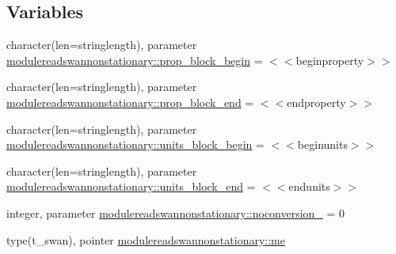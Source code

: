 \subsection*{Variables}
\begin{DoxyCompactItemize}
\item 
character(len=stringlength), parameter \mbox{\hyperlink{namespacemodulereadswannonstationary_a49b70911a8192a84cf1ee4184e95069e}{modulereadswannonstationary\+::prop\+\_\+block\+\_\+begin}} = \textquotesingle{}$<$$<$beginproperty$>$$>$\textquotesingle{}
\item 
character(len=stringlength), parameter \mbox{\hyperlink{namespacemodulereadswannonstationary_ae64bbd606aac4edda645ed73e9fd7342}{modulereadswannonstationary\+::prop\+\_\+block\+\_\+end}} = \textquotesingle{}$<$$<$endproperty$>$$>$\textquotesingle{}
\item 
character(len=stringlength), parameter \mbox{\hyperlink{namespacemodulereadswannonstationary_a3bfcd82f3cfda93a9ca86cdb6a3bd39c}{modulereadswannonstationary\+::units\+\_\+block\+\_\+begin}} = \textquotesingle{}$<$$<$beginunits$>$$>$\textquotesingle{}
\item 
character(len=stringlength), parameter \mbox{\hyperlink{namespacemodulereadswannonstationary_a2523cfc89ab979041c4b91a534e60cf0}{modulereadswannonstationary\+::units\+\_\+block\+\_\+end}} = \textquotesingle{}$<$$<$endunits$>$$>$\textquotesingle{}
\item 
integer, parameter \mbox{\hyperlink{namespacemodulereadswannonstationary_aa944582a0a1b3c5a5141261697feb2ad}{modulereadswannonstationary\+::noconversion\+\_\+}} = 0
\item 
type(t\+\_\+swan), pointer \mbox{\hyperlink{namespacemodulereadswannonstationary_a540bd39474b6ce05d78950b2abf1c1af}{modulereadswannonstationary\+::me}}
\end{DoxyCompactItemize}
